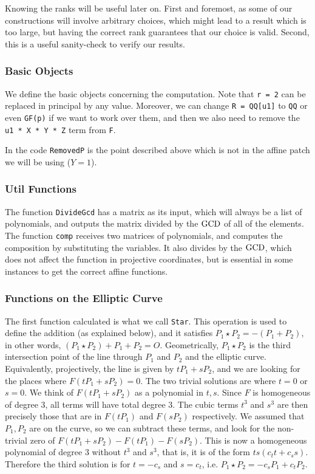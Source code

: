 Knowing the ranks will be useful later on.
First and foremost, as some of our constructions will involve arbitrary choices, which might lead to a result which is too large, but having the correct rank guarantees that our choice is valid.
Second, this is a useful sanity-check to verify our results. 

\subsubsection{Basic Objects}

We define the basic objects concerning the computation.
Note that \texttt{r = 2} can be replaced in principal by any value.	
Moreover, we can change \texttt{R = QQ[u1]} to \texttt{QQ} or even \texttt{GF(p)} if we want to work over them, and then we also need to remove the \texttt{u1 * X * Y * Z} term from \texttt{F}.

In the code \texttt{RemovedP} is the point described above which is not in the affine patch we will be using ($Y = 1$).

\subsubsection{Util Functions}

The function \texttt{DivideGcd} has a matrix as its input, which will always be a list of polynomials, and outputs the matrix divided by the $\operatorname{GCD}$ of all of the elements.
The function \texttt{comp} receives two matrices of polynomials, and computes the composition by substituting the variables.
It also divides by the $\operatorname{GCD}$, which does not affect the function in projective coordinates, but is essential in some instances to get the correct affine functions.

\subsubsection{Functions on the Elliptic Curve}

The first function calculated is what we call \texttt{Star}.
This operation is used to define the addition (as explained below), and it satisfies $P_1 \star P_2 = - \left(P_1 + P_2\right)$, in other words, $\left(P_1 \star P_2\right) + P_1 + P_2 = O$.
Geometrically, $P_1 \star P_2$ is the third intersection point of the line through $P_1$ and $P_2$ and the elliptic curve.
Equivalently, projectively, the line is given by $t P_1 + s P_2$, and we are looking for the places where $F\left(t P_1 + s P_2\right) = 0$.
The two trivial solutions are where $t = 0$ or $s = 0$.
We think of $F\left(t P_1 + s P_2\right)$ as a polynomial in $t,s$.
Since $F$ is homogeneous of degree $3$, all terms will have total degree $3$.
The cubic terms $t^3$ and $s^3$ are then precisely those that are in $F\left(t P_1\right)$ and $F\left(s P_2\right)$ respectively.
We assumed that $P_1,P_2$ are on the curve, so we can subtract these terms, and look for the non-trivial zero of $F\left(t P_1 + s P_2\right) - F\left(t P_1\right) - F\left(s P_2\right)$.
This is now a homogeneous polynomial of degree $3$ without $t^3$ and $s^3$, that is, it is of the form $t s \left(c_t t + c_s s\right)$.
Therefore the third solution is for $t = -c_s$ and $s = c_t$, i.e. $P_1 \star P_2 = -c_s P_1 + c_t P_2$.

